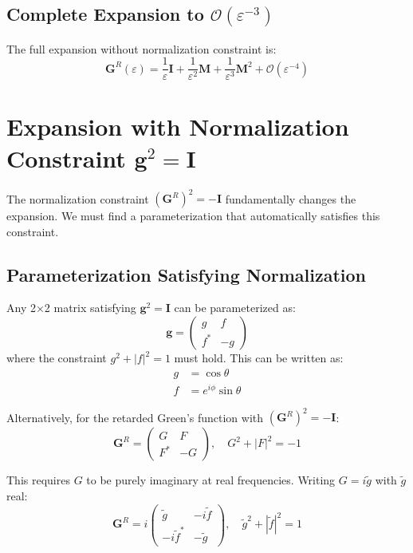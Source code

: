 \documentclass[12pt]{article}
\begin{document}
\subsection{Complete Expansion to $\mathcal{O}(\varepsilon^{-3})$}

The full expansion without normalization constraint is:
\begin{equation}
\mathbf{G}^R(\varepsilon) = \frac{1}{\varepsilon}\mathbf{I} + \frac{1}{\varepsilon^2}\mathbf{M} + \frac{1}{\varepsilon^3}\mathbf{M}^2 + \mathcal{O}(\varepsilon^{-4})
\end{equation}

\section{Expansion with Normalization Constraint $\mathbf{g}^2 = \mathbf{I}$}

The normalization constraint $(\mathbf{G}^R)^2 = -\mathbf{I}$ fundamentally changes the expansion. We must find a parameterization that automatically satisfies this constraint.

\subsection{Parameterization Satisfying Normalization}

Any 2×2 matrix satisfying $\mathbf{g}^2 = \mathbf{I}$ can be parameterized as:
\begin{equation}
\mathbf{g} = \begin{pmatrix}
g & f \\
f^* & -g
\end{pmatrix}
\end{equation}
where the constraint $g^2 + |f|^2 = 1$ must hold. This can be written as:
\begin{align}
g &= \cos\theta \\
f &= e^{i\phi} \sin\theta
\end{align}

Alternatively, for the retarded Green's function with $(\mathbf{G}^R)^2 = -\mathbf{I}$:
\begin{equation}
\mathbf{G}^R = \begin{pmatrix}
G & F \\
F^* & -G
\end{pmatrix}, \quad G^2 + |F|^2 = -1
\end{equation}

This requires $G$ to be purely imaginary at real frequencies. Writing $G = i\tilde{g}$ with $\tilde{g}$ real:
\begin{equation}
\boxed{
\mathbf{G}^R = i\begin{pmatrix}
\tilde{g} & -i\tilde{f} \\
-i\tilde{f}^* & -\tilde{g}
\end{pmatrix}, \quad \tilde{g}^2 + |\tilde{f}|^2 = 1
}
\end{equation}
\end{document}
